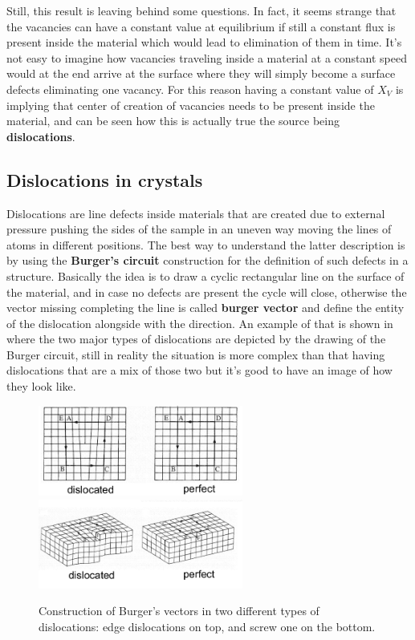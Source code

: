 Still, this result is leaving behind some questions. In fact, it seems strange that the vacancies can have a constant value at equilibrium if still a constant flux is present inside the material which would lead to elimination of them in time. It's not easy to imagine how vacancies traveling inside a material at a constant speed would at the end arrive at the surface where they will simply become a surface defects eliminating one vacancy. For this reason having a constant value of $X_V$ is implying that center of creation of vacancies needs to be present inside the material, and can be seen how this is actually true the source being \textbf{dislocations}.

\subsection{Dislocations in crystals}

Dislocations are line defects inside materials that are created due to external pressure pushing the sides of the sample in an uneven way moving the lines of atoms in different positions. The best way to understand the latter description is by using the \textbf{Burger's circuit} construction for the definition of such defects in a structure. Basically the idea is to draw a cyclic rectangular line on the surface of the material, and in case no defects are present the cycle will close, otherwise the vector missing completing the line is called \textbf{burger vector} and define the entity of the dislocation alongside with the direction. An example of that is shown in  where the two major types of dislocations are depicted by the drawing of the Burger circuit, still in reality the situation is more complex than that having dislocations that are a mix of those two but it's good to have an image of how they look like.
\begin{figure}[t]
    \centering
    \includegraphics[width=0.6\textwidth]{Immagini/Burg1.png}
    \includegraphics[width=0.6\textwidth]{Immagini/Burg2.png}
    \caption
    {
        Construction of Burger's vectors in two different types of dislocations: edge dislocations on top, and screw one on the bottom. 
    }
    \label{fig:Burg}
\end{figure}

